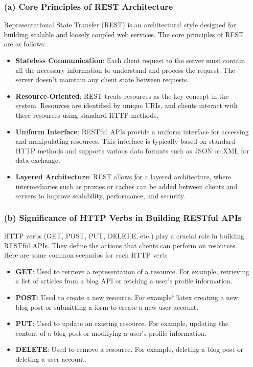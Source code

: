 \documentclass{article}
\begin{document}
\subsubsection*{(a) Core Principles of REST Architecture}
Representational State Transfer (REST) is an architectural style designed for building scalable and loosely coupled web services. The core principles of REST are as follows:
\begin{itemize}
  \item \textbf{Stateless Communication}: Each client request to the server must contain all the necessary information to understand and process the request. The server doesn't maintain any client state between requests.
  \item \textbf{Resource-Oriented}: REST treats resources as the key concept in the system. Resources are identified by unique URIs, and clients interact with these resources using standard HTTP methods.
  \item \textbf{Uniform Interface}: RESTful APIs provide a uniform interface for accessing and manipulating resources. This interface is typically based on standard HTTP methods and supports various data formats such as JSON or XML for data exchange.
  \item \textbf{Layered Architecture}: REST allows for a layered architecture, where intermediaries such as proxies or caches can be added between clients and servers to improve scalability, performance, and security.
\end{itemize}

\subsubsection*{(b) Significance of HTTP Verbs in Building RESTful APIs}
HTTP verbs (GET, POST, PUT, DELETE, etc.) play a crucial role in building RESTful APIs. They define the actions that clients can perform on resources. Here are some common scenarios for each HTTP verb:
\begin{itemize}
  \item \textbf{GET}: Used to retrieve a representation of a resource. For example, retrieving a list of articles from a blog API or fetching a user's profile information.
  \item \textbf{POST}: Used to create a new resource. For example```latex
  creating a new blog post or submitting a form to create a new user account.
  \item \textbf{PUT}: Used to update an existing resource. For example, updating the content of a blog post or modifying a user's profile information.
  \item \textbf{DELETE}: Used to remove a resource. For example, deleting a blog post or deleting a user account.
\end{itemize}
\end{document}
